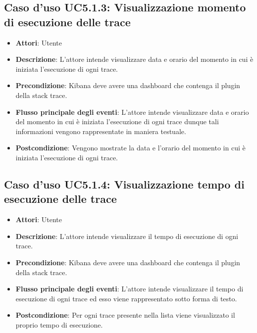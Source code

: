 \subsection{Caso d'uso UC5.1.3: Visualizzazione momento di esecuzione delle trace}
\begin{itemize}
	\item \textbf{Attori}: Utente
	\item \textbf{Descrizione}: L'attore intende visualizzare data e orario del momento in cui è iniziata l'esecuzione di ogni trace.
	\item \textbf{Precondizione}: Kibana deve avere una dashboard che contenga il plugin della stack trace.
	\item \textbf{Flusso principale degli eventi}: L'attore intende visualizzare data e orario del momento in cui è iniziata l'esecuzione di ogni trace dunque tali informazioni vengono rappresentate in maniera testuale.
	\item \textbf{Postcondizione}: Vengono mostrate la data e l'orario del momento in cui è iniziata l'esecuzione di ogni trace.
\end{itemize}
\subsection{Caso d'uso UC5.1.4: Visualizzazione tempo di esecuzione delle trace}
\begin{itemize}
	\item \textbf{Attori}: Utente
	\item \textbf{Descrizione}: L'attore intende visualizzare il tempo di esecuzione di ogni trace.
	\item \textbf{Precondizione}: Kibana deve avere una dashboard che contenga il plugin della stack trace.
	\item \textbf{Flusso principale degli eventi}: L'attore intende visualizzare il tempo di esecuzione di ogni trace ed esso viene rappresentato sotto forma di testo.
	\item \textbf{Postcondizione}: Per ogni trace presente nella lista viene visualizzato il proprio tempo di esecuzione.
\end{itemize}
